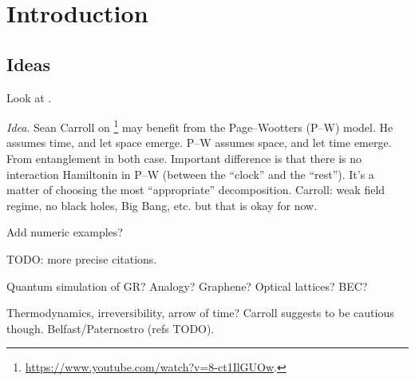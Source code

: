 \chapter{Introduction}

\section{Ideas}

Look at \cite{
    CarrollMereo,
    ColafrancheschiPhD,
    szpak2014curved,
    Josset_2017_thermo,
    EinsteinFromEntanglement,
    speranza2018eeg,
    GRQO_2020,
    Shore_QGO,
    OQEG,
    QSimCurved,
    SpacetimeFromEntanglement,
    CMFT,
    SMQO1}.

\emph{Idea}. Sean Carroll on \footnote{ \url{https://www.youtube.com/watch?v=8-ct1IlGUOw}. }
may benefit from the Page--Wootters (P--W) model. He assumes time, and let space emerge.
P--W assumes space, and let time emerge. From entanglement in both case. Important difference
is that there is no interaction Hamiltonin in P--W (between the ``clock'' and the ``rest'').
It's a matter of choosing the most ``appropriate'' decomposition. Carroll: weak field regime,
no black holes, Big Bang, etc. but that is okay for now.

Add numeric examples?

TODO: more precise citations.

Quantum simulation of GR? Analogy? Graphene? Optical lattices? BEC?

Thermodynamics, irreversibility, arrow of time? Carroll suggests to be cautious though.
Belfast/Paternostro (refs TODO).

